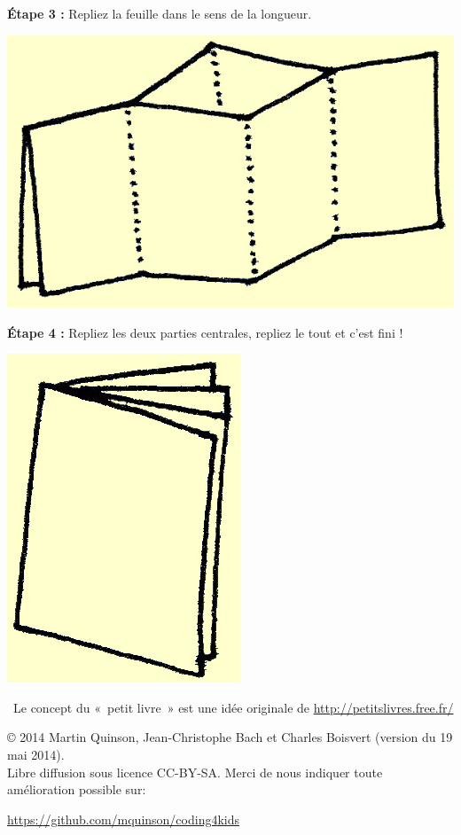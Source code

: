 \documentclass[a4paper,12pt]{article}
\begin{document}
\begin{minipage}[b]{.45\linewidth}
\bigskip %
\noindent\textbf{Étape 3 :} Repliez la feuille dans le sens de la longueur.\\

\centerline{\includegraphics{img/ptitlivre-etape4.jpg}}
  
\bigskip

\noindent
\begin{minipage}{.6\linewidth}
\noindent\textbf{Étape 4 :} Repliez les deux parties centrales, repliez
le tout et c'est fini !
\end{minipage}\hfill%
\begin{minipage}{.35\linewidth}
  \includegraphics{img/ptitlivre-etape5.jpg}
\end{minipage}

\bigskip
\end{minipage}

\bigskip~\hfill{\small Le concept du «~petit livre~» est une idée
  originale de {\color{blue}\url{http://petitslivres.free.fr/}}}
  
\bigskip \bigskip \bigskip \normalsize %
\noindent\copyright{} 2014 Martin Quinson, Jean-Christophe Bach et
Charles Boisvert
(version du 19 mai 2014). \\ Libre diffusion sous licence
CC-BY-SA. Merci de nous indiquer toute amélioration possible sur:

\centerline{\color{blue}\url{https://github.com/mquinson/coding4kids}}
\end{document}
